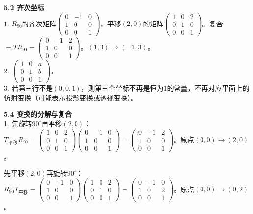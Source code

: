 \noindent\textbf{5.2 齐次坐标}\\
1. $R_{90}$的齐次矩阵$\begin{pmatrix}0&-1&0\\1&0&0\\0&0&1\end{pmatrix}$，平移$(2,0)$的矩阵$\begin{pmatrix}1&0&2\\0&1&0\\0&0&1\end{pmatrix}$。复合$=T R_{90}=\begin{pmatrix}0&-1&2\\1&0&0\\0&0&1\end{pmatrix}$。$(1,3)\to(-1,3)$。\\
2. $\begin{pmatrix}1&0&a\\0&1&b\\0&0&1\end{pmatrix}$。\\
3. 若第三行不是$(0,0,1)$，则第三个坐标不再是恒为$1$的常量，不再对应平面上的仿射变换（可能表示投影变换或透视变换）。

\noindent\textbf{5.4 变换的分解与复合}\\
1. 先旋转$90^\circ$再平移$(2,0)$：$T_{\text{平移}}R_{90}=\begin{pmatrix}1&0&2\\0&1&0\\0&0&1\end{pmatrix}\begin{pmatrix}0&-1&0\\1&0&0\\0&0&1\end{pmatrix}=\begin{pmatrix}0&-1&2\\1&0&0\\0&0&1\end{pmatrix}$。原点$(0,0)\to(2,0)$。

先平移$(2,0)$再旋转$90^\circ$：$R_{90}T_{\text{平移}}=\begin{pmatrix}0&-1&0\\1&0&0\\0&0&1\end{pmatrix}\begin{pmatrix}1&0&2\\0&1&0\\0&0&1\end{pmatrix}=\begin{pmatrix}0&-1&0\\1&0&2\\0&0&1\end{pmatrix}$。原点$(0,0)\to(0,2)$。

